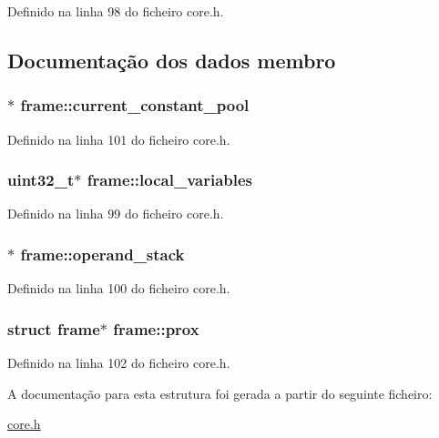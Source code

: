 Definido na linha 98 do ficheiro core.\-h.



\subsection{Documentação dos dados membro}
\hypertarget{structframe_a44e706fb58a455a533afd748c097c9d0}{
\subsubsection[{current\-\_\-constant\-\_\-pool}]{$\ast$ frame\-::current\-\_\-constant\-\_\-pool}}\label{structframe_a44e706fb58a455a533afd748c097c9d0}


Definido na linha 101 do ficheiro core.\-h.

\hypertarget{structframe_afb48efe21a0642a382ef875628272cfd}{
\subsubsection[{local\-\_\-variables}]{\setlength{\rightskip}{0pt plus 5cm}uint32\-\_\-t$\ast$ frame\-::local\-\_\-variables}}\label{structframe_afb48efe21a0642a382ef875628272cfd}


Definido na linha 99 do ficheiro core.\-h.

\hypertarget{structframe_a0e69123161d7ee38be16d922f09dc320}{
\subsubsection[{operand\-\_\-stack}]{$\ast$ frame\-::operand\-\_\-stack}}\label{structframe_a0e69123161d7ee38be16d922f09dc320}


Definido na linha 100 do ficheiro core.\-h.

\hypertarget{structframe_ad5c645b97d4a17c7352bf29e7396cea4}{
\subsubsection[{prox}]{\setlength{\rightskip}{0pt plus 5cm}struct {\bf frame}$\ast$ frame\-::prox}}\label{structframe_ad5c645b97d4a17c7352bf29e7396cea4}


Definido na linha 102 do ficheiro core.\-h.



A documentação para esta estrutura foi gerada a partir do seguinte ficheiro\-:\begin{DoxyCompactItemize}
\item 
\hyperlink{core_8h}{core.\-h}\end{DoxyCompactItemize}
